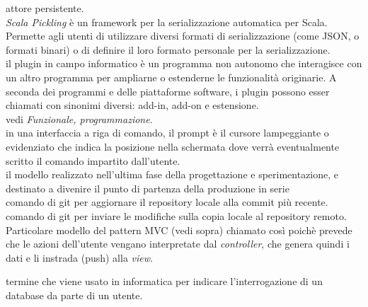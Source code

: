 \documentclass{scalatekids-article}
\begin{document}
   attore persistente.
  \\

   \textit{Scala Pickling} è un framework per la serializzazione automatica per Scala. Permette agli utenti di utilizzare diversi formati di serializzazione (come JSON, o formati binari) o di definire il loro formato personale per la serializzazione.
  \\

   il plugin in campo informatico è un programma non autonomo che interagisce con un altro programma per ampliarne o estenderne le funzionalità originarie.
  A seconda dei programmi e delle piattaforme software, i plugin possono esser chiamati con sinonimi diversi: add-in, add-on e estensione.
  \\
  
   vedi \textit{Funzionale, programmazione}.
  \\
  
   in una interfaccia a riga di comando, il prompt è il cursore lampeggiante o evidenziato che indica la posizione nella schermata dove verrà eventualmente scritto il comando impartito dall'utente.
  \\

   il modello realizzato nell’ultima fase della progettazione e sperimentazione, e destinato a divenire il punto di partenza della produzione in serie
  \\

   comando di git per aggiornare il repository locale alla commit più recente.
  \\

   comando di git per inviare le modifiche sulla copia locale al repository remoto.
  \\

   Particolare modello del pattern MVC (vedi sopra) chiamato così poichè prevede che le azioni dell'utente vengano interpretate dal \textit{controller}, che genera quindi i dati e li instrada (push) alla \textit{view}.
  \\


   termine che viene usato in informatica per indicare l'interrogazione di un database da parte di un utente.
  \\

\end{document}
